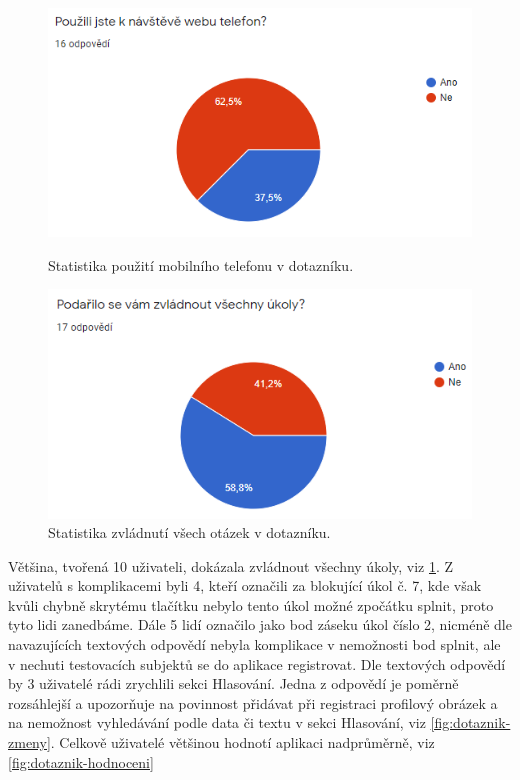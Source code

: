 \begin{figure}[!tbp]
  \centering
  \begin{minipage}[b]{0.45\textwidth}
    \includegraphics[width=\textwidth]{obrazky-figures/dotaznik-mobil.png}
    \caption{Statistika použití mobilního telefonu v dotazníku.}
    \label{fig:dotaznik-mobil}
  \end{minipage}
  \hfill
  \begin{minipage}[b]{0.45\textwidth}
    \includegraphics[width=\textwidth]{obrazky-figures/dotaznik-vsechno.png}
    \caption{Statistika zvládnutí všech otázek v dotazníku.}
    \label{fig:dotaznik-vsechno}
  \end{minipage}
\end{figure}

\par Většina, tvořená 10 uživateli, dokázala zvládnout všechny úkoly, viz \ref{fig:dotaznik-vsechno}. Z uživatelů s komplikacemi byli 4, kteří označili za blokující úkol č. 7, kde však kvůli chybně skrytému tlačítku nebylo tento úkol možné zpočátku splnit, proto tyto lidi zanedbáme. Dále 5 lidí označilo jako bod záseku úkol číslo 2, nicméně dle navazujících textových odpovědí nebyla komplikace v nemožnosti bod splnit, ale v nechuti testovacích subjektů se do aplikace registrovat. Dle textových odpovědí by 3 uživatelé rádi zrychlili sekci Hlasování. Jedna z odpovědí je poměrně rozsáhlejší a upozorňuje na povinnost přidávat při registraci profilový obrázek a na nemožnost vyhledávání podle data či textu v sekci Hlasování, viz \ref{fig:dotaznik-zmeny}. Celkově uživatelé většinou hodnotí aplikaci nadprůměrně, viz \ref{fig:dotaznik-hodnoceni}

